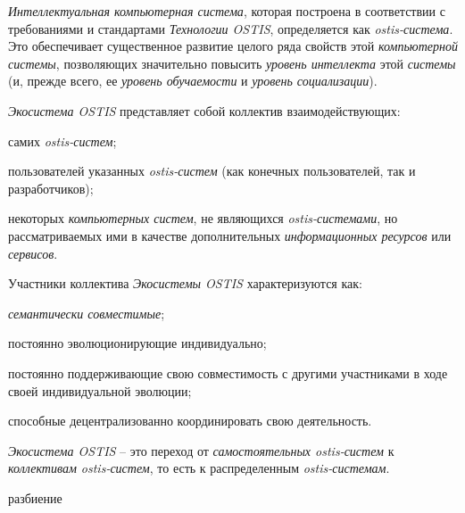 \textit{Интеллектуальная компьютерная система}, которая построена в соответствии с требованиями и стандартами \textit{Технологии OSTIS}, определяется как \textit{ostis-система}. 
Это обеспечивает существенное развитие целого ряда свойств этой \textit{компьютерной системы}, позволяющих значительно повысить \textit{уровень интеллекта} этой \textit{системы} (и, прежде всего, ее \textit{уровень обучаемости} и \textit{уровень социализации}). 

\textit{Экосистема OSTIS} представляет собой коллектив взаимодействующих:
\begin{textitemize}
    \item самих \textit{ostis-систем};
    \item пользователей указанных \textit{ostis-систем} (как конечных пользователей, так и разработчиков);
    \item некоторых \textit{компьютерных систем}, не являющихся \textit{ostis-системами}, но рассматриваемых ими в качестве дополнительных \textit{информационных ресурсов} или \textit{сервисов}.
\end{textitemize}

Участники коллектива \textit{Экосистемы OSTIS} характеризуются как:
\begin{textitemize}
    \item \textit{семантически совместимые};
    \item постоянно эволюционирующие индивидуально;
    \item постоянно поддерживающие свою совместимость с другими участниками в ходе своей индивидуальной эволюции;
    \item способные децентрализованно координировать свою деятельность.
\end{textitemize}

\textit{Экосистема OSTIS} – это переход от \textit{самостоятельных ostis-систем} к \textit{коллективам ostis-систем}, то есть к распределенным \textit{ostis-системам}.

\begin{SCn}
\begin{scnrelfromset}{разбиение}
\end{scnrelfromset}
\end{SCn}

